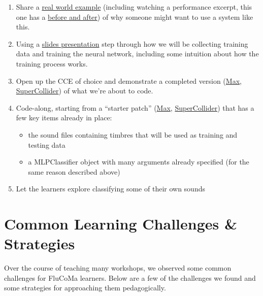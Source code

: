\documentclass{article}
\providecommand{\tightlist}{%
  \setlength{\itemsep}{0pt}\setlength{\parskip}{0pt}}
\begin{document}
\begin{enumerate}
\def\labelenumi{\arabic{enumi}.}
\tightlist
\item
  Share a
  \href{https://f003.backblazeb2.com/file/learnassets/examples/teaching-material/classifier-example.pdf}{real
  world example} (including watching a performance excerpt, this one has
  a \href{https://youtu.be/8QtvjMUGGB8}{before and after}) of why
  someone might want to use a system like this.
\item
  Using a
  \href{https://f003.backblazeb2.com/file/learnassets/examples/teaching-material/classifier-process.pdf}{slides
  presentation} step through how we will be collecting training data and
  training the neural network, including some intuition about how the
  training process works.
\item
  Open up the CCE of choice and demonstrate a completed version
  (\href{https://learn.flucoma.org/examples/classification-video-demo.maxpat}{Max},
  \href{https://learn.flucoma.org/examples/classification-video-demo.scd}{SuperCollider})
  of what we're about to code.
\item
  Code-along, starting from a ``starter patch''
  (\href{https://learn.flucoma.org/examples/classification-video-starter.maxpat}{Max},
  \href{https://learn.flucoma.org/examples/classification-video-starter.scd}{SuperCollider})
  that has a few key items already in place:

  \begin{itemize}
  \tightlist
  \item
    the sound files containing timbres that will be used as training and testing data
  \item
    a MLPClassifier object with many arguments already specified (for the same reason described above)
  \end{itemize}
\item
  Let the learners explore classifying some of their own sounds
\end{enumerate}

\section{Common Learning Challenges \& Strategies}\label{common-learning-challenges-strategies}

Over the course of teaching many workshops, we observed some common
challenges for FluCoMa learners. Below are a few of the challenges we
found and some strategies for approaching them pedagogically.
\end{document}
